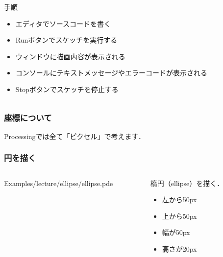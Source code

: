 \documentclass[10pt, dvipdfmx]{beamer}
\begin{document}
\begin{frame}
\begin{columns}[c]
\begin{column}{0.45\textwidth}
                    \begin{block}{手順}
                        \begin{itemize}
                            \item エディタでソースコードを書く
                            \item Runボタンでスケッチを実行する
                            \item ウィンドウに描画内容が表示される
                            \item コンソールにテキストメッセージやエラーコードが表示される
                            \item Stopボタンでスケッチを停止する
                        \end{itemize}
                    \end{block}
                \end{column}
            \end{columns}
        \end{frame}

        \begin{frame}
            \frametitle{座標について}
            \Large
            Processingでは全て「ピクセル」で考えます．
        \end{frame}

        \begin{frame}
            \frametitle{円を描く}
            \begin{columns}[c]
                \begin{column}{0.50\textwidth}
                    \tiny
                    Examples/lecture/ellipse/ellipse.pde
                    \scriptsize
                \end{column}
                \begin{column}{0.50\textwidth}
                    \begin{block}{楕円（ellipse）を描く．}
                        \begin{itemize}
                            \item 左から50px
                            \item 上から50px
                            \item 幅が50px
                            \item 高さが20px
                        \end{itemize}
                    \end{block}
                \end{column}
            \end{columns}
        \end{frame}
\end{document}
